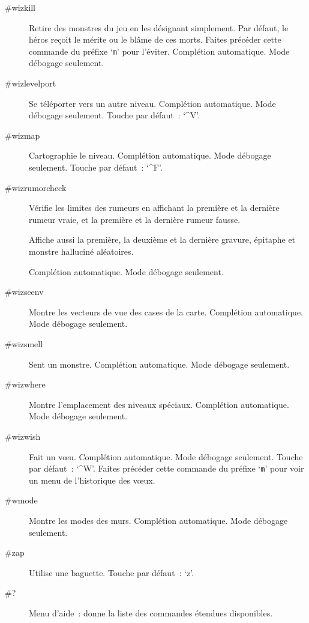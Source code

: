 \documentclass[titlepage]{article}
\begin{document}
\begin{description}
\item[{\#wizkill}]
Retire des monstres du jeu en les désignant simplement.
Par défaut, le héros reçoit le mérite ou le blâme de ces morts.
Faites précéder cette commande du préfixe `\texttt{m}' pour l'éviter.
Complétion automatique.
Mode débogage seulement.

\item[{\#wizlevelport}]
Se téléporter vers un autre niveau.
Complétion automatique.
Mode débogage seulement.
Touche par défaut~: `\textasciicircum{}V'.

\item[{\#wizmap}]
Cartographie le niveau.
Complétion automatique.
Mode débogage seulement.
Touche par défaut~: `\textasciicircum{}F'.

\item[{\#wizrumorcheck}]
Vérifie les limites des rumeurs en affichant la première et la dernière
rumeur vraie, et la première et la dernière rumeur fausse.


Affiche aussi la première, la deuxième et la dernière gravure, épitaphe et
monstre halluciné aléatoires.


Complétion automatique.
Mode débogage seulement.

\item[{\#wizseenv}]
Montre les vecteurs de vue des cases de la carte.
Complétion automatique.
Mode débogage seulement.

\item[{\#wizsmell}]
Sent un monstre.
Complétion automatique.
Mode débogage seulement.

\item[{\#wizwhere}]
Montre l'emplacement des niveaux spéciaux.
Complétion automatique.
Mode débogage seulement.

\item[{\#wizwish}]
Fait un vœu.
Complétion automatique.
Mode débogage seulement.
Touche par défaut~: `\textasciicircum{}W'.
Faites précéder cette commande du préfixe `\texttt{m}' pour voir un
menu de l'historique des vœux.

\item[{\#wmode}]
Montre les modes des murs.
Complétion automatique.
Mode débogage seulement.

\item[{\#zap}]
Utilise une baguette.
Touche par défaut~: `z'.

\item[{\#?}]
Menu d'aide~: donne la liste des commandes étendues disponibles.



\end{description}
\end{document}
